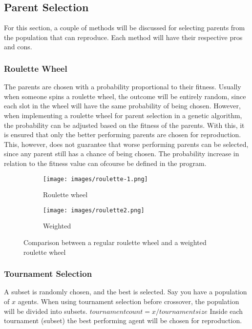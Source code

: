\documentclass{article}
\begin{document}
\bigskip
\subsection{Parent Selection}
For this section, a couple of methods will be discussed for selecting parents from the population that can reproduce. Each method will have their respective pros and cons.

\subsubsection{Roulette Wheel}
The parents are chosen with a probability proportional to their fitness. Usually when someone spins a roulette wheel, the outcome will be entirely random, since each slot in the wheel will have the same probability of being chosen. However, when implementing a roulette wheel for parent selection in a genetic algorithm, the probability can be adjusted based on the fitness of the parents. With this, it is ensured that only the better performing parents are chosen for reproduction. This, however, does not guarantee that worse performing parents can be selected, since any parent still has a chance of being chosen. The probability increase in relation to the fitness value can ofcourse be defined in the program. 

\begin{figure}[h!]
    \centering
    \begin{subfigure}[b]{0.2\linewidth}
      \texttt{[image: images/roulette-1.png]}
      \caption{Roulette wheel}
    \end{subfigure}
    \begin{subfigure}[b]{0.2\linewidth}
      \texttt{[image: images/roulette2.png]}
      \caption{Weighted}
    \end{subfigure}
    \caption{Comparison between a regular roulette wheel and a weighted roulette wheel}
    \label{fig:roulette}
  \end{figure}

\subsubsection{Tournament Selection}
A subset is randomly chosen, and the best is selected. Say you have a population of $x$ agents. When using tournament selection before crossover, the population will be divided into subsets. $tournamentcount = x/tournamentsize$ Inside each tournament (subset) the best performing agent will be chosen for reproduction. 
\end{document}

